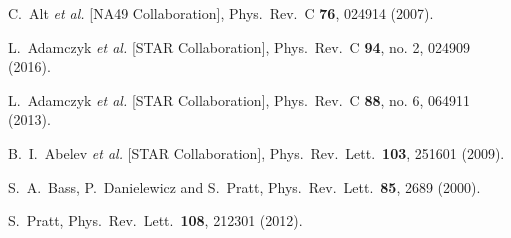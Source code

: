 \documentclass[aps,prc,nofootinbib,showpacs,superscriptaddress,groupedaddress]{revtex4-1}
\begin{document}
\begin{thebibliography}{99}
  C.~Alt {\it et al.} [NA49 Collaboration],
  Phys.\ Rev.\ C {\bf 76}, 024914 (2007).

  L.~Adamczyk {\it et al.} [STAR Collaboration],
  Phys.\ Rev.\ C {\bf 94}, no. 2, 024909 (2016).

  L.~Adamczyk {\it et al.} [STAR Collaboration],
  Phys.\ Rev.\ C {\bf 88}, no. 6, 064911 (2013).

  B.~I.~Abelev {\it et al.} [STAR Collaboration],
  Phys.\ Rev.\ Lett.\  {\bf 103}, 251601 (2009).

  S.~A.~Bass, P.~Danielewicz and S.~Pratt,
  Phys.\ Rev.\ Lett.\  {\bf 85}, 2689 (2000).

  S.~Pratt,
  Phys.\ Rev.\ Lett.\  {\bf 108}, 212301 (2012).



\end{thebibliography}
\end{document}

